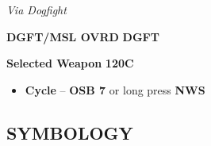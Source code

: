 \documentclass[fontInter]{TechCheck}
\begin{document}
\begin{tableitemize}
{		\emph{Via Dogfight}

		\begin{subenumerate}
			\item \textbf{DGFT/MSL OVRD} \dotfill \textbf{DGFT}
			\item \textbf{Selected Weapon} \dotfill \textbf{120C}
			\begin{itemize}
				\item \textbf{Cycle} -- \textbf{OSB 7} or long press \textbf{NWS}
			\end{itemize}
		\end{subenumerate}}
	\end{tableitemize}

	\clearpage

	\subsection{SYMBOLOGY}
	\begin{tableitemize}
	\end{tableitemize}
	
	\clearpage
\end{document}
